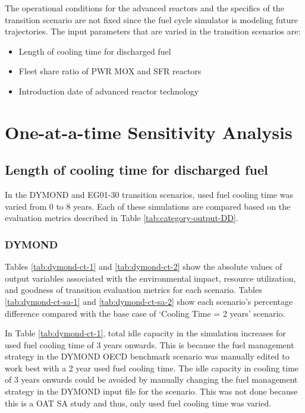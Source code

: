 The operational conditions for the advanced reactors and
the specifics of the transition scenario are not 
fixed since the fuel cycle simulator is modeling future 
trajectories. 
The input parameters that are varied in the
transition scenarios are: 
\begin{itemize}
    \item Length of cooling time for discharged fuel 
    \item Fleet share ratio of PWR MOX and SFR reactors 
	\item Introduction date of advanced reactor technology
\end{itemize}

\section{One-at-a-time Sensitivity Analysis}
\label{sec:oat}

\subsection{Length of cooling time for discharged fuel}
In the DYMOND and \Cyclus EG01-30 transition scenarios, 
used fuel cooling time was varied from 0 to 8 years. 
Each of these simulations are compared based on the evaluation 
metrics described in Table \ref{tab:category-output-DD}.

\subsubsection{\textbf{DYMOND}}
Tables \ref{tab:dymond-ct-1} and \ref{tab:dymond-ct-2} show 
the absolute values of 
output variables associated with the environmental impact, 
resource utilization, and goodness of transition evaluation 
metrics for each scenario. 
Tables \ref{tab:dymond-ct-sa-1} and \ref{tab:dymond-ct-sa-2} 
show each scenario's percentage 
difference compared with the base case of `Cooling Time = 2 years'
scenario.

In Table \ref{tab:dymond-ct-1}, total idle capacity 
in the simulation increases for used fuel cooling time of 3 years 
onwards. 
This is because the fuel management strategy in the 
DYMOND OECD benchmark scenario was 
manually edited to work best with a 2 year used fuel cooling time.
The idle capacity in cooling time of 3 years onwards could be 
avoided by manually changing the fuel management strategy
in the DYMOND input file for the scenario. 
This was not done because this is a OAT \gls{SA} study and thus, only 
used fuel cooling time was varied. 


